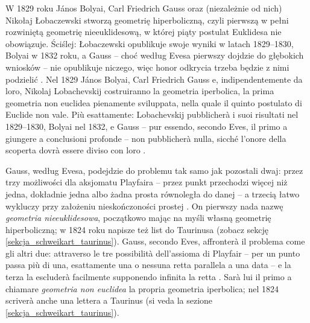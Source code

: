 W 1829 roku János Bolyai, Carl Friedrich Gauss oraz (niezależnie od nich) Nikołaj Łobaczewski stworzą geometrię hiperboliczną, czyli pierwszą w pełni rozwiniętą geometrię nieeuklidesową, w której piąty postulat Euklidesa nie obowiązuje. %
Ściślej: Łobaczewski opublikuje swoje wyniki w latach 1829--1830, Bolyai w 1832 roku, a Gauss -- choć według Evesa pierwszy dojdzie do głębokich wniosków -- nie opublikuje niczego, więc honor odkrycia trzeba będzie z nimi podzielić \cite[s. 287]{eves1_1972}. %
Nel 1829 János Bolyai, Carl Friedrich Gauss e, indipendentemente da loro, Nikolaj Lobachevskij costruiranno la geometria iperbolica, la prima geometria non euclidea pienamente sviluppata, nella quale il quinto postulato di Euclide non vale. %
Più esattamente: Lobachevskij pubblicherà i suoi risultati nel 1829--1830, Bolyai nel 1832, e Gauss -- pur essendo, secondo Eves, il primo a giungere a conclusioni profonde -- non pubblicherà nulla, sicché l'onore della scoperta dovrà essere diviso con loro \cite[p. 287]{eves1_1972}. %

Gauss, według Evesa, podejdzie do problemu tak samo jak pozostali dwaj: przez trzy możliwości dla aksjomatu Playfaira -- przez punkt przechodzi więcej niż jedna, dokładnie jedna albo żadna prosta równoległa do danej -- a trzecią łatwo wykluczy przy założeniu nieskończoności prostej \cite[s. 287]{eves1_1972}. %
On pierwszy nada nazwę \emph{geometria nieeuklidesowa}, początkowo mając na myśli własną geometrię hiperboliczną; w 1824 roku napisze też list do Taurinusa (zobacz sekcję \ref{sekcja_schweikart_taurinus}). %
Gauss, secondo Eves, affronterà il problema come gli altri due: attraverso le tre possibilità dell'assioma di Playfair -- per un punto passa più di una, esattamente una o nessuna retta parallela a una data -- e la terza la escluderà facilmente supponendo infinita la retta \cite[p. 287]{eves1_1972}. %
Sarà lui il primo a chiamare \emph{geometria non euclidea} la propria geometria iperbolica; nel 1824 scriverà anche una lettera a Taurinus (si veda la sezione \ref{sekcja_schweikart_taurinus}). %

